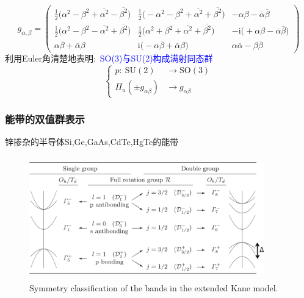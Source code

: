 {{{\begin{displaymath}
	g_{\alpha,\beta}=
	\begin{pmatrix}
		\frac12\big(\alpha^2-\beta^2+\overline{\alpha^2}-\overline{\beta^2}\big) &\frac{\mathrm{i}}2\big(-\alpha^2-\beta^2+\overline{\alpha^2}+\overline{\beta^2}\big) &-\alpha\beta-\overline{\alpha}\overline{\beta}\\
		\frac{\mathrm{i}}2\big(\alpha^2-\beta^2-\overline{\alpha^2}+\overline{\beta^2}\big) &\frac12\big(\alpha^2+\beta^2+\overline{\alpha^2}+\overline{\beta^2}\big) &-\mathrm{i}\big(+\alpha\beta-\overline{\alpha}\overline{\beta}\big)\\
		\alpha\overline{\beta}+\overline{\alpha}\beta &\mathrm{i}\big(-\alpha\overline{\beta}+\overline{\alpha}\beta\big) &\alpha\overline{\alpha}-\beta\overline{\beta}
	\end{pmatrix}
\end{displaymath}
利用\textrm{Euler}角清楚地表明:~\textcolor{blue}{\textrm{SO(3)}与\textrm{SU(2)}构成满射同态群}
\begin{displaymath}
	\left\{
		\begin{aligned}
			p:~\mathrm{SU(2)}&\rightarrow \mathrm{SO(3)}\\
			\Pi_u(\pm g_{\alpha\beta})&\rightarrow g_{\alpha\beta}
		\end{aligned}
		\right.
\end{displaymath}
}}
}

\frame
{
	\frametitle{能带的双值群表示}
	锌掺杂的半导体\textrm{Si},\textrm{Ge},\textrm{GaAs},\textrm{CdTe},\textrm{HgTe}的能带
	\begin{figure}[h!]
\centering
\vspace*{-0.10in}
\includegraphics[height=2.1in,width=4.00in,viewport=0 0 1490 730,clip]{Figures/SOC_double-group.png}
\caption{\tiny \textrm{Symmetry classification of the bands in the extended Kane model.}}%
\label{Fig:Double-Group}
\end{figure}
}


